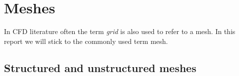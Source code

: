 

    










\section{Meshes}
\label{sec:general_meshes}
In CFD literature often the term \emph{grid} is also used to refer to a mesh. In this report we will stick to the commonly used term mesh. 

\subsection{Structured and unstructured meshes}




